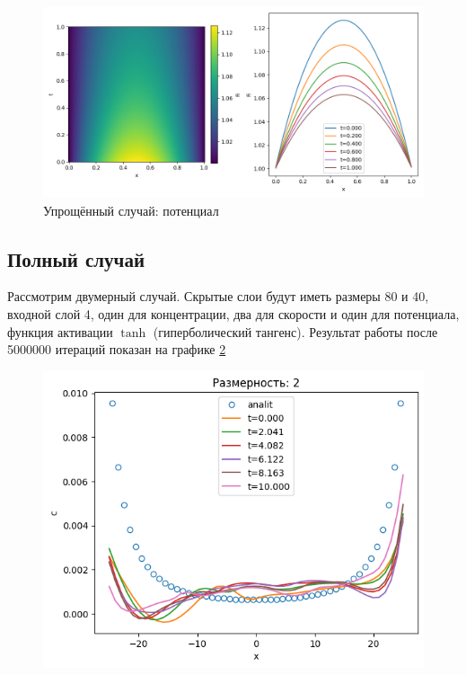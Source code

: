 \begin{figure}[ht]
    \includegraphics[width=\textwidth]{../plots/1-dim Phi simpified tanh 80,20.png}
    \caption{Упрощённый случай: потенциал}
    \label{fig:1d:simp:Fi}
\end{figure}

\subsection{Полный случай}

Рассмотрим двумерный случай. Скрытые слои будут иметь размеры 80 и 40, входной слой 4, один для концентрации, два для скорости и один для потенциала, функция активации $\tanh$ (гиперболический тангенс). Результат работы после 5000000 итераций показан на графике \ref{fig:2dres}

\begin{figure}[ht]
    \includegraphics[scale=0.5]{../plots/2dim tanh 80 20.png}
    \caption{}
    \label{fig:2dres}
\end{figure}

